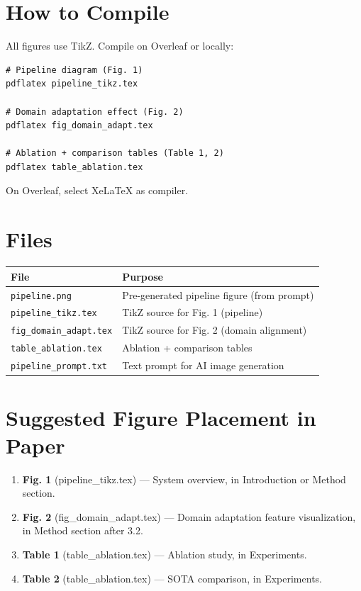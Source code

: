 \documentclass[10pt]{article}
\begin{document}
\section*{How to Compile}

All figures use TikZ. Compile on Overleaf or locally:

\begin{verbatim}
# Pipeline diagram (Fig. 1)
pdflatex pipeline_tikz.tex

# Domain adaptation effect (Fig. 2)
pdflatex fig_domain_adapt.tex

# Ablation + comparison tables (Table 1, 2)
pdflatex table_ablation.tex
\end{verbatim}

On Overleaf, select XeLaTeX as compiler.

\section*{Files}
\begin{tabular}{ll}
\toprule
File & Purpose \\
\midrule
\texttt{pipeline.png} & Pre-generated pipeline figure (from prompt) \\
\texttt{pipeline\_tikz.tex} & TikZ source for Fig. 1 (pipeline) \\
\texttt{fig\_domain\_adapt.tex} & TikZ source for Fig. 2 (domain alignment) \\
\texttt{table\_ablation.tex} & Ablation + comparison tables \\
\texttt{pipeline\_prompt.txt} & Text prompt for AI image generation \\
\bottomrule
\end{tabular}

\section*{Suggested Figure Placement in Paper}

\begin{enumerate}
  \item \textbf{Fig. 1} (pipeline\_tikz.tex) --- System overview, in Introduction or Method section.
  \item \textbf{Fig. 2} (fig\_domain\_adapt.tex) --- Domain adaptation feature visualization, in Method section after 3.2.
  \item \textbf{Table 1} (table\_ablation.tex) --- Ablation study, in Experiments.
  \item \textbf{Table 2} (table\_ablation.tex) --- SOTA comparison, in Experiments.
\end{enumerate}
\end{document}
